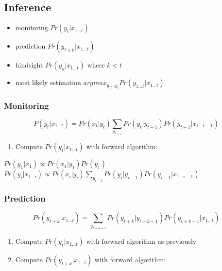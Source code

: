 \documentclass[]{article}
\theoremstyle{definition}
\begin{document}
\subsection{Inference}
\label{sub:inference}

\begin{itemize}
    \item monitoring $Pr(y_t | x_{1 \ldots t} )$
    \item prediction $Pr(y_{t+k} | x_{1 \ldots t} )$
    \item hindsight $Pr(y_k | x_{1 \ldots t} )$ where $k < t$
    \item most likely estimation $argmax_{y_1 \ldots y_t} Pr(y_{1 \ldots t} | x_{1 \ldots t})$
\end{itemize}

\subsubsection{Monitoring}
\begin{equation*}
    P(y_t | x_{1 \ldots t}) = Pr(x_t | y_t) \sum_{y_{t-1}} Pr(y_t | y_{t-1}) Pr(y_{t-1} | x_{1 \ldots t-1})
\end{equation*}

\begin{enumerate}
    \item Compute $Pr(y_t | x_{1 \ldots t})$ with forward algorithm:
\end{enumerate}

\begin{algorithmic}
    \State $Pr(y_1 | x_1) \propto Pr(x_1 | y_1) Pr(y_1)$
    \State $Pr(y_i | x_{1 \ldots i}) \propto Pr(x_i | y_i) \sum_{y_{i-1}} Pr(y_i | y_{i-1}) Pr(y_{i-1} | x_{1 \ldots i-1})$
    \EndFor
\end{algorithmic}

\subsubsection{Prediction}
\label{ssub:Prediction}

\begin{equation*}
    Pr(y_{t+k} | x_{1 \ldots t}) = \sum_{y_{t + k -1}} Pr(y_{t+k} | y_{t+k-1}) Pr(y_{t+k-1} | x_{1 \ldots t})
\end{equation*}

\begin{enumerate}
    \item Compute $Pr(y_t | x_{1 \ldots t})$ with forward algorithm as previously
    \item Compute $Pr(y_{t+k} | x_{1 \ldots t})$ with forward algorithm:
\end{enumerate}
\end{document}
